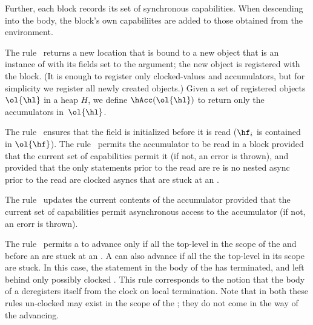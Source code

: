 Further,
each block records its set of synchronous capabilities. When
descending into the body, the block's own capabiliites are added to
those obtained from the environment.

%
The rule~ returns a new location that is bound to a new
object that is an instance of \hC{} with its fields set to the argument;
    the new object is registered with the block.
(It is enough to register only clocked-values and accumulators, but
    for simplicity we register all newly created objects.)
Given a set of registered objects $\ol{\hl}$ in a heap $H$,
    we define
    $\hAcc(\ol{\hl})$ to return only the accumulators in~$\ol{\hl}$.



%
The rule~ ensures that the field is initialized before it is
read ($\hf_i$ is contained in $\ol{\hf}$).
%
The rule~ permits the accumulator to be read in a
block provided that the current set of capabilities permit it (if not,
an error is thrown), and provided that the only statements prior to
the read are re is no nested async prior to the read are clocked
asyncs that are stuck at an \hadvance.

The rule~ updates the current contents of the
accumulator provided that the current set of capabilities permit
asynchronous access to the accumulator (if not, an erorr is thrown).

The rule~ permits a  to advance
only if all the top-level  in the scope of the
 and before an  are stuck at an
. A  can also advance if all the
the top-level  in its scope are stuck. In this
case, the statement in the body of the  has
terminated, and left behind only possibly clocked . This
rule corresponds to the notion that the body of a  deregisters itself from the clock on local termination.
Note that in both these rules un-clocked  may exist in the
scope of the ; they do not come in the way of the
 advancing.



